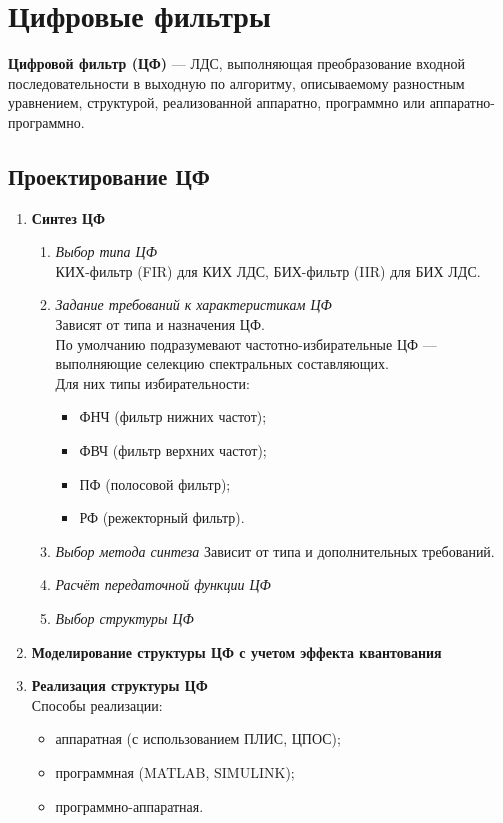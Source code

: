 \documentclass[a4paper, 14pt]{extarticle}
\begin{document}
\section{Цифровые фильтры}
\textbf{Цифровой фильтр (ЦФ)} --- ЛДС, выполняющая преобразование входной последовательности в выходную по алгоритму, описываемому разностным уравнением, структурой, реализованной аппаратно, программно или аппаратно-программно.

\subsection{Проектирование ЦФ}
\begin{enumerate}
    \item \textbf{Синтез ЦФ}
        \begin{enumerate}
            \item \textit{Выбор типа ЦФ}\\
                КИХ-фильтр (FIR) для КИХ ЛДС, БИХ-фильтр (IIR) для БИХ ЛДС.
            \item \textit{Задание требований к характеристикам ЦФ}\\
                Зависят от типа и назначения ЦФ.\\
                По умолчанию подразумевают частотно-избирательные ЦФ --- выполняющие селекцию спектральных составляющих. \\
                Для них типы избирательности:
                \begin{itemize}
                    \item ФНЧ (фильтр нижних частот);
                    \item ФВЧ (фильтр верхних частот);
                    \item ПФ (полосовой фильтр);
                    \item РФ (режекторный фильтр).
                \end{itemize}
            \item \textit{Выбор метода синтеза}
                Зависит от типа и дополнительных требований.
            \item \textit{Расчёт передаточной функции ЦФ}
            \item \textit{Выбор структуры ЦФ}
        \end{enumerate}
    \item \textbf{Моделирование структуры ЦФ с учетом эффекта квантования}
    \item \textbf{Реализация структуры ЦФ}\\
        Способы реализации:
        \begin{itemize}
            \item аппаратная (с использованием ПЛИС, ЦПОС);
            \item программная (MATLAB, SIMULINK);
            \item программно-аппаратная.
        \end{itemize}
\end{enumerate}
\end{document}
